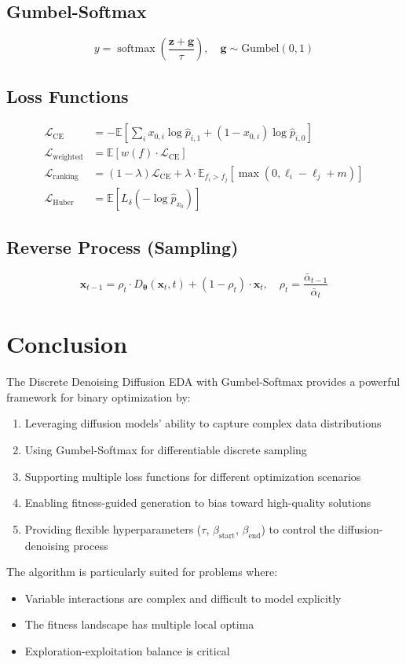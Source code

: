\documentclass[11pt,a4paper]{article}
\newcommand{\E}{\mathbb{E}}
\newcommand{\vx}{\mathbf{x}}
\newcommand{\vtheta}{\boldsymbol{\theta}}
\DeclareMathOperator{\softmax}{softmax}
\begin{document}
\subsection{Gumbel-Softmax}
\begin{equation}
    y = \softmax\left(\frac{\mathbf{z} + \mathbf{g}}{\tau}\right), \quad \mathbf{g} \sim \text{Gumbel}(0,1)
\end{equation}

\subsection{Loss Functions}
\begin{align}
    \mathcal{L}_{\text{CE}} &= -\E\left[\sum_i x_{0,i}\log\hat{p}_{i,1} + (1-x_{0,i})\log\hat{p}_{i,0}\right] \\
    \mathcal{L}_{\text{weighted}} &= \E\left[w(f) \cdot \mathcal{L}_{\text{CE}}\right] \\
    \mathcal{L}_{\text{ranking}} &= (1-\lambda)\mathcal{L}_{\text{CE}} + \lambda \cdot \E_{f_i > f_j}\left[\max(0, \ell_i - \ell_j + m)\right] \\
    \mathcal{L}_{\text{Huber}} &= \E\left[L_\delta(-\log \hat{p}_{x_0})\right]
\end{align}

\subsection{Reverse Process (Sampling)}
\begin{equation}
    \vx_{t-1} = \rho_t \cdot D_\vtheta(\vx_t, t) + (1-\rho_t) \cdot \vx_t, \quad \rho_t = \frac{\bar{\alpha}_{t-1}}{\bar{\alpha}_t}
\end{equation}

\section{Conclusion}

The Discrete Denoising Diffusion EDA with Gumbel-Softmax provides a powerful framework for binary optimization by:

\begin{enumerate}
    \item Leveraging diffusion models' ability to capture complex data distributions
    \item Using Gumbel-Softmax for differentiable discrete sampling
    \item Supporting multiple loss functions for different optimization scenarios
    \item Enabling fitness-guided generation to bias toward high-quality solutions
    \item Providing flexible hyperparameters ($\tau$, $\beta_{\text{start}}$, $\beta_{\text{end}}$) to control the diffusion-denoising process
\end{enumerate}

The algorithm is particularly suited for problems where:
\begin{itemize}
    \item Variable interactions are complex and difficult to model explicitly
    \item The fitness landscape has multiple local optima
    \item Exploration-exploitation balance is critical
\end{itemize}
\end{document}
